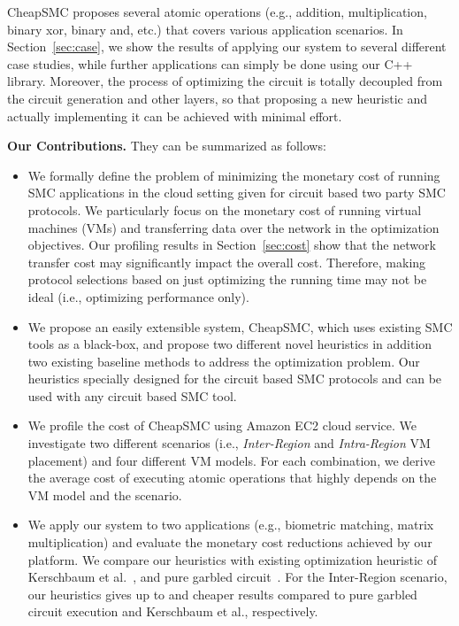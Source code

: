 \documentclass{llncs}
\newcommand{\sysname}{{CheapSMC}\xspace}
\begin{document}
\sysname proposes several atomic operations (e.g., addition, multiplication, binary xor, binary and, etc.) that covers various application scenarios. In Section~\ref{sec:case}, we show the results of applying our system to several different case studies, while further applications can simply be done using our C++ library. Moreover, the process of optimizing the circuit is totally decoupled from the circuit generation and other layers, so that proposing a new heuristic and actually implementing it can be achieved with minimal effort.

\textbf{Our Contributions.} They can be summarized as follows:
\begin{itemize}
	\item We formally define the problem of minimizing the monetary cost of running SMC applications in the cloud setting given for circuit based two party SMC protocols. We particularly focus on the monetary cost of running virtual machines (VMs) and transferring data over the network in the optimization objectives. Our profiling results in Section~\ref{sec:cost} show that the network transfer cost may significantly impact the overall cost. Therefore, making protocol selections based on just optimizing the running time may not be ideal (i.e., optimizing performance only).
	\item We propose an easily extensible system, \sysname, which uses existing SMC tools as a black-box, and propose two different novel heuristics in addition two existing baseline methods to address the optimization problem. Our heuristics specially designed for the circuit based SMC protocols and can be used with any circuit based SMC tool.
	\item We profile the cost of \sysname using Amazon EC2 cloud service. We investigate two different scenarios (i.e., \emph{Inter-Region} and \emph{Intra-Region} VM placement) and four different VM models. For each combination, we derive the average cost of executing atomic operations that highly depends on the VM model and the scenario.
	\item We apply our system to two applications (e.g., biometric matching, matrix multiplication) and evaluate the monetary cost reductions achieved by our platform. We compare our heuristics with existing optimization heuristic of Kerschbaum et al.~\cite{cite:kerschbaum2014automatic}, and pure garbled circuit~\cite{cite:yao1982protocols}. For the Inter-Region scenario, our heuristics gives up to  and  cheaper results compared to pure garbled circuit execution and Kerschbaum et al., respectively. 
\end{itemize}
\end{document}
